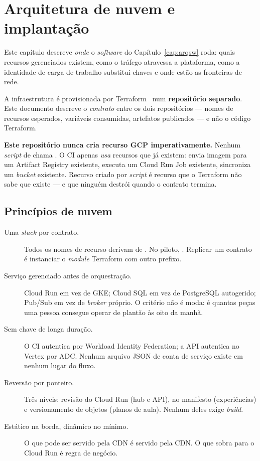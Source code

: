\chapter{Arquitetura de nuvem e implantação}
\label{cap:arqnuvem}

Este capítulo descreve \emph{onde} o \emph{software} do
Capítulo~\ref{cap:arqsw} roda: quais recursos gerenciados existem, como o
tráfego atravessa a plataforma, como a identidade de carga de trabalho
substitui chaves e onde estão as fronteiras de rede.

A infraestrutura é provisionada por Terraform~\cite{brikman2022terraform} num
\textbf{repositório separado}. Este documento descreve o \emph{contrato} entre os
dois repositórios --- nomes de recursos esperados, variáveis consumidas,
artefatos publicados --- e não o código Terraform.

\begin{regra}
\textbf{Este repositório nunca cria recurso GCP imperativamente.} Nenhum
\emph{script} de  chama . O CI apenas
\emph{usa} recursos que já existem: envia imagem para um Artifact Registry
existente, executa um Cloud Run Job existente, sincroniza um \emph{bucket}
existente. Recurso criado por \emph{script} é recurso que o Terraform não sabe
que existe --- e que ninguém destrói quando o contrato termina.
\end{regra}

\section{Princípios de nuvem}

\begin{description}
  \item[Uma \emph{stack} por contrato.] Todos os nomes de recurso derivam de
    . No piloto,
    . Replicar um contrato é instanciar o
    \emph{module} Terraform com outro prefixo.
  \item[Serviço gerenciado antes de orquestração.] Cloud Run em vez de GKE;
    Cloud SQL em vez de PostgreSQL autogerido; Pub/Sub em vez de \emph{broker}
    próprio. O critério não é moda: é quantas peças uma pessoa consegue operar de
    plantão às oito da manhã.
  \item[Sem chave de longa duração.] O CI autentica por Workload Identity
    Federation; a API autentica no Vertex por ADC. Nenhum arquivo JSON de conta
    de serviço existe em nenhum lugar do fluxo.
  \item[Reversão por ponteiro.] Três níveis: revisão do Cloud Run (hub e API),
     no manifesto (experiências) e versionamento de objetos
    (planos de aula). Nenhum deles exige \emph{build}.
  \item[Estático na borda, dinâmico no mínimo.] O que pode ser servido pela CDN
    é servido pela CDN. O que sobra para o Cloud Run é regra de negócio.
\end{description}


